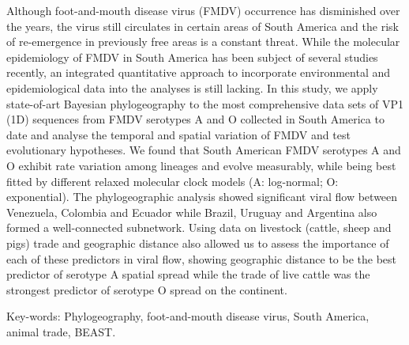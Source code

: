 \documentclass[10pt]{article}
\begin{document}
Although foot-and-mouth disease virus (FMDV) occurrence has disminished over the years, the virus still circulates in certain areas of South America and the risk of re-emergence in previously free areas is a constant threat.
While the molecular epidemiology of FMDV in South America has been subject of several studies recently, an integrated quantitative approach to incorporate environmental and epidemiological data into the analyses is still lacking.
In this study, we apply state-of-art Bayesian phylogeography to the most comprehensive data sets of VP1 (1D) sequences from FMDV serotypes A and O collected in South America to date and analyse the temporal and spatial variation of FMDV and test evolutionary hypotheses.
We found that South American FMDV serotypes A and O exhibit rate variation among lineages and evolve measurably, while being best fitted by different relaxed molecular clock models (A: log-normal; O: exponential).
The phylogeographic analysis showed significant viral flow between Venezuela, Colombia and Ecuador while Brazil, Uruguay and Argentina also formed a well-connected subnetwork.
Using data on livestock (cattle, sheep and pigs) trade and geographic distance also allowed us to assess the importance of each of these predictors in viral flow, showing geographic distance to be the best predictor of serotype A spatial spread while the trade of live cattle was the strongest predictor of serotype O spread on the continent.

Key-words: Phylogeography, foot-and-mouth disease virus, South America, animal trade, BEAST.
\end{document}
